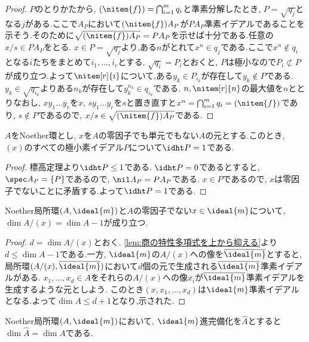\begin{proof}
	$P$のとりかたから, $(\nitem{f})=\bigcap_{i=1}^m q_i$と準素分解したとき, $P=\sqrt{q_j}$となる$j$がある.ここで$A_P$において$(\nitem{f})A_P$が$PA_P$準素イデアルであることを示そう.そのために$\sqrt{(\nitem{f})A_P}=PA_P$を示せば十分である.任意の$x/s\in PA_P$をとる. $x\in P=\sqrt{q_j}$より,ある$n$がとれて$x^n\in q_j$である.ここで$x^n\not\in q_i$となる$i$たちをまとめて$i_1,\dots,i_r$とする. $\sqrt{q_i}=P_i$とおくと, $P$は極小なので$P_i\not\subset P$が成り立つ.よって$\nitem[r]{i}$について,ある$y_k\in P_{i_k}$が存在して$y_k\not\in P$である. $y_k\in\sqrt{q_{i_k}}$よりある$n_k$が存在して$y_k^{n_k}\in q_{i_k}$である. $n,\nitem[r]{n}$の最大値を$n$ととりなおし, $xy_1\dots y_r$を$x$, $sy_1\dots y_r$を$s$と置き直すと$x^n=\bigcap_{i=1}^m q_i=(\nitem{f})$であり, $s\not\in P$であるので, $x/s\in\sqrt{(\nitem{f})A_P}$である.
\end{proof}

\begin{cor}
	$A$をNoether環とし, $x$を$A$の零因子でも単元でもない$A$の元とする.このとき, $(x)$のすべての極小素イデアル$P$について$\idht P=1$である.
\end{cor}

\begin{proof}
	標高定理より$\idht P\leq1$である. $\idht P=0$であるとすると, $\spec A_P=\{P\}$であるので, $\nil A_P=PA_P$である. $x\in P$であるので, $x$は零因子でないことに矛盾する.よって$\idht P=1$である.
\end{proof}

\begin{prop}
	Noether局所環$(A,\ideal{m})$と$A$の零因子でない$x\in\ideal{m}$について, $\dim A/(x)=\dim A-1$が成り立つ.
\end{prop}

\begin{proof}
	$d=\dim A/(x)$とおく. \ref{lem:商の特性多項式を上から抑える}より$d\leq \dim A-1$である.一方, $\ideal{m}$の$A/(x)$への像を$\bar{\ideal{m}}$とすると,局所環$(A/(x),\bar{\ideal{m}})$において$d$個の元で生成される$\bar{\ideal{m}}$準素イデアルがある. $x_1,\dots,x_d\in A$をそれらの$A/(x)$への像$\bar{x_i}$が$\bar{\ideal{m}}$準素イデアルを生成するような元としよう. このとき$(x,x_1,\dots,x_d)$は$\ideal{m}$準素イデアルとなる.よって$\dim A\leq d+1$となり,示された.
\end{proof}

\begin{thm}\label{thm:完備化は次元を保つ}
	Noether局所環$(A,\ideal{m})$において, $\ideal{m}$進完備化を$\widehat{A}$とすると$\dim\widehat{A}=\dim A$である.
\end{thm}

